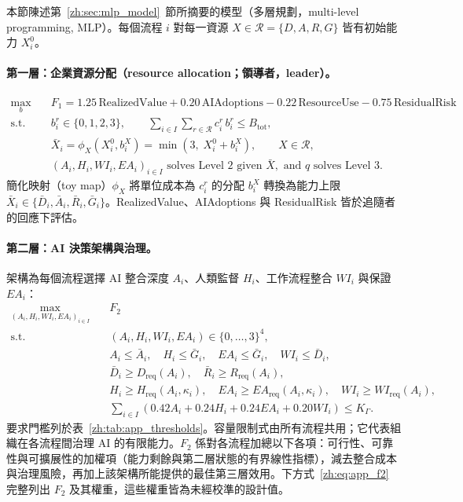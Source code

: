 本節陳述第~\ref{zh:sec:mlp_model}~節所摘要的模型（多層規劃，multi-level programming, MLP）。每個流程 $i$ 對每一資源 $X\in\mathcal{R}=\{D,A,R,G\}$ 皆有初始能力 $X_i^0$。

\paragraph{第一層：企業資源分配（resource allocation；領導者，leader）。}
\begin{align}
\max_{b}\quad & F_1 = 1.25\,\mathrm{RealizedValue} + 0.20\,\mathrm{AIAdoptions} - 0.22\,\mathrm{ResourceUse} - 0.75\,\mathrm{ResidualRisk} \label{zh:eq:mlp_l1}\\
\text{s.t.}\quad & b_i^r\in\{0,1,2,3\}, \qquad \sum_{i\in I}\sum_{r\in\mathcal{R}} c_i^r\, b_i^r \leq B_{\mathrm{tot}}, \nonumber\\
& \bar{X}_i = \phi_X\!\left(X_i^0, b_i^X\right) = \min\!\left(3,\; X_i^0 + b_i^X\right), \qquad X\in\mathcal{R}, \nonumber\\
& (A_i,H_i,WI_i,EA_i)_{i\in I} \text{ solves Level 2 given } \bar{X}, \text{ and } q \text{ solves Level 3}. \nonumber
\end{align}
簡化映射（toy map）$\phi_X$ 將單位成本為 $c_i^r$ 的分配 $b_i^X$ 轉換為能力上限 $\bar{X}_i\in\{\bar D_i,\bar A_i,\bar R_i,\bar G_i\}$。RealizedValue、AIAdoptions 與 ResidualRisk 皆於追隨者的回應下評估。

\paragraph{第二層：AI 決策架構與治理。}架構為每個流程選擇 AI 整合深度 $A_i$、人類監督 $H_i$、工作流程整合 $WI_i$ 與保證 $EA_i$：
\begin{align}
\max_{(A_i,H_i,WI_i,EA_i)_{i\in I}}\quad & F_2 \label{zh:eq:mlp_l2}\\
\text{s.t.}\quad & (A_i,H_i,WI_i,EA_i)\in\{0,\dots,3\}^4, \nonumber\\
& A_i\leq\bar{A}_i,\quad H_i\leq\bar{G}_i,\quad EA_i\leq\bar{G}_i,\quad WI_i\leq\bar{D}_i, \nonumber\\
& \bar{D}_i\geq D_{\mathrm{req}}(A_i),\quad \bar{R}_i\geq R_{\mathrm{req}}(A_i), \nonumber\\
& H_i\geq H_{\mathrm{req}}(A_i,\kappa_i),\quad EA_i\geq EA_{\mathrm{req}}(A_i,\kappa_i),\quad WI_i\geq WI_{\mathrm{req}}(A_i), \nonumber\\
& \sum_{i\in I}\left(0.42A_i + 0.24H_i + 0.24EA_i + 0.20WI_i\right)\leq K_\Gamma. \nonumber
\end{align}
要求門檻列於表~\ref{zh:tab:app_thresholds}。容量限制式由所有流程共用；它代表組織在各流程間治理 AI 的有限能力。$F_2$ 係對各流程加總以下各項：可行性、可靠性與可擴展性的加權項（能力剩餘與第二層狀態的有界線性指標），減去整合成本與治理風險，再加上該架構所能提供的最佳第三層效用。下方式~\eqref{zh:eq:app_f2} 完整列出 $F_2$ 及其權重，這些權重皆為未經校準的設計值。

